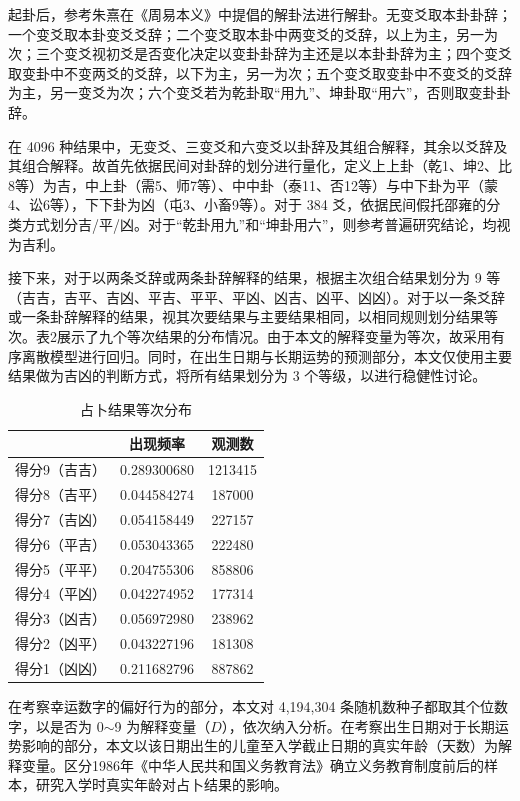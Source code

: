 \documentclass[11pt, a4paper, UTF8]{chinese-erj}
\begin{document}
起卦后，参考朱熹在《周易本义》中提倡的解卦法进行解卦。无变爻取本卦卦辞；一个变爻取本卦变爻爻辞；二个变爻取本卦中两变爻的爻辞，以上为主，另一为次；三个变爻视初爻是否变化决定以变卦卦辞为主还是以本卦卦辞为主；四个变爻取变卦中不变两爻的爻辞，以下为主，另一为次；五个变爻取变卦中不变爻的爻辞为主，另一变爻为次；六个变爻若为乾卦取“用九”、坤卦取“用六”，否则取变卦卦辞。

在 4096 种结果中，无变爻、三变爻和六变爻以卦辞及其组合解释，其余以爻辞及其组合解释。故首先依据民间对卦辞的划分进行量化，定义上上卦（乾1、坤2、比8等）为吉，中上卦（需5、师7等）、中中卦（泰11、否12等）与中下卦为平（蒙4、讼6等），下下卦为凶（屯3、小畜9等）。对于 384 爻，依据民间假托邵雍的分类方式划分吉/平/凶。对于“乾卦用九”和“坤卦用六”，则参考普遍研究结论，均视为吉利。

接下来，对于以两条爻辞或两条卦辞解释的结果，根据主次组合结果划分为 9 等（吉吉，吉平、吉凶、平吉、平平、平凶、凶吉、凶平、凶凶）。对于以一条爻辞或一条卦辞解释的结果，视其次要结果与主要结果相同，以相同规则划分结果等次。表2展示了九个等次结果的分布情况。由于本文的解释变量为等次，故采用有序离散模型进行回归。同时，在出生日期与长期运势的预测部分，本文仅使用主要结果做为吉凶的判断方式，将所有结果划分为 3 个等级，以进行稳健性讨论。

\begin{table}[]
\centering
\caption{占卜结果等次分布}
\begin{tabular}{lcc}
\toprule
 & 出现频率 & 观测数 \\
\midrule
得分9（吉吉） & 0.289300680 & 1213415 \\
得分8（吉平） & 0.044584274 & 187000 \\
得分7（吉凶） & 0.054158449 & 227157 \\
得分6（平吉） & 0.053043365 & 222480 \\
得分5（平平） & 0.204755306 & 858806 \\
得分4（平凶） & 0.042274952 & 177314 \\
得分3（凶吉） & 0.056972980 & 238962 \\
得分2（凶平） & 0.043227196 & 181308 \\
得分1（凶凶） & 0.211682796 & 887862 \\
\bottomrule
\end{tabular}
\end{table}

在考察幸运数字的偏好行为的部分，本文对 4,194,304 条随机数种子都取其个位数字，以是否为 0$\sim$9 为解释变量（$D$），依次纳入分析。在考察出生日期对于长期运势影响的部分，本文以该日期出生的儿童至入学截止日期的真实年龄（天数）为解释变量。区分1986年《中华人民共和国义务教育法》确立义务教育制度前后的样本，研究入学时真实年龄对占卜结果的影响。
\end{document}
